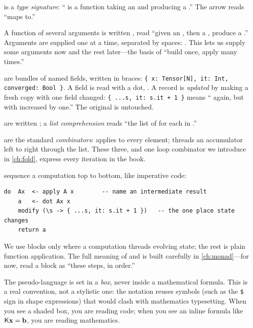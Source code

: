 \begin{description}[style=nextline,leftmargin=1.5em]
  \item[\code{f :: A -> B}] is a \emph{type signature}: `` is a function
  taking an  and producing a .'' The arrow \code{->} reads
  ``maps to.''
  \item[Currying.] A function of several arguments is written
  , read ``given an , then a , produce a
  .'' Arguments are supplied one at a time, separated by spaces:
  . This lets us supply some arguments now and the rest later---the
  basis of ``build once, apply many times.''
  \item[Records] are bundles of named fields, written in braces:
  \lstinline[style=l4style]|{ x: Tensor[N], it: Int, converged: Bool }|. A field
  is read with a dot, . A record is \emph{updated} by making a fresh
  copy with one field changed: \lstinline[style=l4style]|{ ...s, it: s.it + 1 }|
  means `` again, but with  increased by one.'' The original
   is untouched.
  \item[Lists] are written \code{[a, b, c]}; a \emph{list comprehension}
  \code{[ f x | x <- xs ]} reads ``the list of  for each  in
  .''
  \item[\code{foldl}, \code{foldr}, \code{map}] are the standard
  \emph{combinators}:  applies  to every element;
   threads an accumulator left to right through the list.
  These three, and one loop combinator we introduce in \cref{ch:fold}, express
  every iteration in the book.
  \item[\code{do} blocks] sequence a computation top to bottom, like imperative
  code:
\begin{lstlisting}[style=l4style]
do  Ax  <- apply A x        -- name an intermediate result
    a   <- dot Ax x
    modify (\s -> { ...s, it: s.it + 1 })   -- the one place state changes
    return a
\end{lstlisting}
  We use  blocks only where a computation threads evolving state; the
  rest is plain function application. The full meaning of  and
   is built carefully in \cref{ch:monad}---for now, read a
   block as ``these steps, in order.''
\end{description}

\begin{notationbox}
The pseudo-language is set in a \emph{box}, never inside a mathematical formula.
This is a real convention, not a stylistic one: the notation reuses symbols
(such as the \texttt{\$} sign in shape expressions) that would clash with
mathematics typesetting. When you see a shaded box, you are reading code; when
you see an inline formula like $\mathsf{K}\mathbf{x}=\mathbf{b}$, you are reading mathematics.
\end{notationbox}

